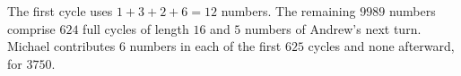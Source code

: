 The first cycle uses $1+3+2+6=12$ numbers. The remaining $9989$ numbers comprise $624$ full cycles of length $16$ and $5$ numbers of Andrew's next turn. Michael contributes $6$ numbers in each of the first $625$ cycles and none afterward, for $\boxed{3750}$.
